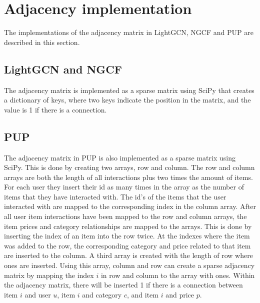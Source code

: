 \section{Adjacency implementation}\label{app:adj-impl}
The implementations of the adjacency matrix in LightGCN, NGCF and PUP are described in this section.

\subsection{LightGCN and NGCF}
The adjacency matrix is implemented as a sparse matrix using SciPy that creates a dictionary of keys, where two keys indicate the position in the matrix, and the value is 1 if there is a connection.

\subsection{PUP}
The adjacency matrix in PUP is also implemented as a sparse matrix using SciPy.
This is done by creating two arrays, row and column.
The row and column arrays are both the length of all interactions plus two times the amount of items.
For each user they insert their id as many times in the array as the number of items that they have interacted with.
The id's of the items that the user interacted with are mapped to the corresponding index in the column array.
After all user item interactions have been mapped to the row and column arrays, the item prices and category relationships are mapped to the arrays.
This is done by inserting the index of an item into the row twice.
At the indexes where the item was added to the row, the corresponding category and price related to that item are inserted to the column.
A third array is created with the length of row where ones are inserted.
Using this array, column and row can create a sparse adjacency matrix by mapping the index $i$ in row and column to the array with ones.
Within the adjacency matrix, there will be inserted 1 if there is a connection between item $i$ and user $u$, item $i$ and category $c$, and item $i$ and price $p$.
